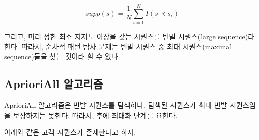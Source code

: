 \documentclass[]{book}
\begin{document}
\begin{equation*}
supp(s) = \frac{1}{N} \sum_{i = 1}^{N} I(s \prec s_i)
\end{equation*}

그리고, 미리 정한 최소 지지도 이상을 갖는 시퀀스를 빈발 시퀀스(large sequence)라 한다. 따라서, 순차적 패턴 탐사 문제는 빈발 시퀀스 중 최대 시퀀스(maximal sequence)들을 찾는 것이라 할 수 있다.

\hypertarget{association-aprioriall}{%
\subsection{AprioriAll 알고리즘}\label{association-aprioriall}}

AprioriAll 알고리즘은 빈발 시퀀스를 탐색하나, 탐색된 시퀀스가 최대 빈발 시퀀스임을 보장하지는 못한다. 따라서, 후에 최대화 단계를 요한다.

아래와 같은 고객 시퀀스가 존재한다고 하자.
\end{document}

